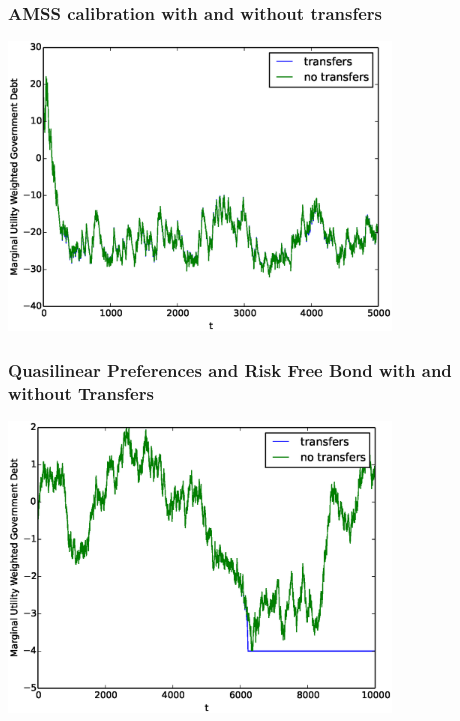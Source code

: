 \documentclass{beamer}
\begin{document}
 \begin{frame}
	\frametitle{AMSS calibration with and without transfers}
	\begin{center}
	\includegraphics[width=4in]{Images/transfer_example1.eps}
	\end{center}
\end{frame}

\begin{frame}
	\frametitle{Quasilinear Preferences and Risk Free Bond  with and without Transfers}
	\begin{center}
	\includegraphics[width=4in]{Images/transfer_example2.eps}
	\end{center}
\end{frame}
\end{document}
